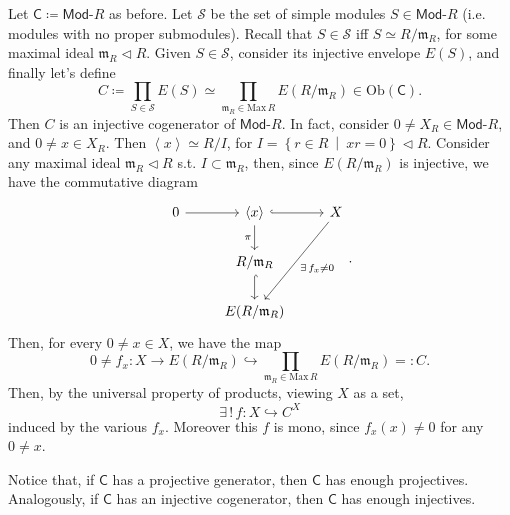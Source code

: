 \begin{ex}
	Let $\mathsf{C}\coloneqq \mathsf{Mod}\text{-}R$ as before.
	Let $\mathcal{S}$ be the set of simple modules $S \in \mathsf{Mod}\text{-}R$ (i.e. modules with no proper submodules).
	Recall that $S \in \mathcal{S}$ iff $S \simeq R/\mathfrak{m}_R$, for some maximal ideal $\mathfrak{m}_R \triangleleft R$.
	Given $S \in \mathcal{S}$, consider its injective envelope $E(S)$, and finally
	let's define
	\begin{equation}
		C \coloneqq \prod_{S \in \mathcal{S}} E(S) \simeq
		\prod_{\mathfrak{m}_R \in \mathrm{Max}\, R} E \left( R / \mathfrak{m}_R \right)
		\in \mathrm{Ob} \left(\mathsf{C}\right)
	.\end{equation} 
	Then $C$ is an injective cogenerator of $\mathsf{Mod}\text{-}R$.
	In fact, consider $0 \neq X_R \in \mathsf{Mod}\text{-}R$, and $0 \neq x \in X_R$.
	Then $\left\langle x \right\rangle \simeq R/I$, 
	for $I = \left\{ r \in R \ \middle|\ xr = 0 \right\} \triangleleft R$.
	Consider any maximal ideal $\mathfrak{m}_R \triangleleft R$ s.t. $I \subset \mathfrak{m}_R$,
	then, since $E(R/\mathfrak{m}_R)$ is injective, we have the commutative diagram
	\begin{equation}
	\begin{tikzcd}
		0 \arrow[r, "", rightarrow] &
		\left\langle x \right\rangle \arrow[r, "", hookrightarrow] \arrow[d, "\pi"', rightarrow] &
		X \arrow[ldd, "\exists\, f_x \neq 0", rightarrow] \\
		& R/\mathfrak{m}_R \arrow[d, "", hookrightarrow] & \\
		& E(R/\mathfrak{m}_R) &
	\end{tikzcd}
	.\end{equation} 
	Then, for every $0 \neq x \in X$, we have the map
	\begin{equation}
		0 \neq f_x\colon X \to E \left( R/\mathfrak{m}_R \right) \hookrightarrow
		\prod_{\mathfrak{m}_R \in \mathrm{Max}\, R} E \left( R / \mathfrak{m}_R \right) =: C
	.\end{equation} 
	Then, by the universal property of products, viewing $X$ as a set,
	\begin{equation}
	\exists\, !\, f\colon X \hookrightarrow C^X
	\end{equation} 
	induced by the various $f_x$.
	Moreover this $f$ is mono, since $f_x(x) \neq 0$ for any $0 \neq x$.
\end{ex} 

\begin{rem}
	Notice that, if $\mathsf{C}$ has a projective generator, then $\mathsf{C}$
	has enough projectives.
	Analogously, if $\mathsf{C}$ has an injective cogenerator, then $\mathsf{C}$ 
	has enough injectives.
\end{rem} 

